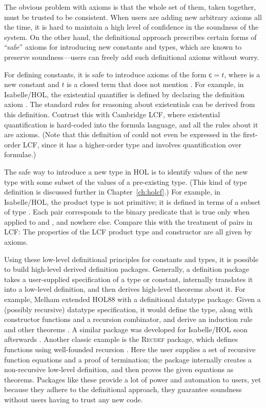 The obvious problem with axioms is that the whole set of them, taken together, must be trusted to be consistent. When users are adding new arbitrary axioms all the time, it is hard to maintain a high level of confidence in the soundness of the system. On the other hand, the definitional approach prescribes certain forms of ``safe'' axioms for introducing new constants and types, which are known to preserve soundness---users can freely add such definitional axioms without worry.

For defining constants, it is safe to introduce axioms of the form $\mathsf{c} = t$, where  is a new constant and $t$ is a closed term that does not mention . For example, in Isabelle/HOL, the existential quantifier  is defined by declaring the definition axiom . The standard rules for reasoning about existentials can be derived from this definition. Contrast this with Cambridge LCF, where existential quantification is hard-coded into the formula language, and all the rules about it are axioms. (Note that this definition of  could not even be expressed in the first-order LCF, since it has a higher-order type and involves quantification over formulae.)

The safe way to introduce a new type in HOL is to identify values of the new type with some subset of the values of a pre-existing type. (This kind of type definition is discussed further in Chapter~\ref{ch:holcf}.) For example, in Isabelle/HOL, the product type  is not primitive; it is defined in terms of a subset of type . Each pair  corresponds to the binary predicate that is true only when applied to  and , and nowhere else. Compare this with the treatment of pairs in LCF: The properties of the LCF product type and  constructor are all given by axioms.

Using these low-level definitional principles for constants and types, it is possible to build high-level derived definition packages. Generally, a definition package takes a user-supplied specification of a type or constant, internally translates it into a low-level definition, and then derives high-level theorems about it. For example, Melham extended HOL88 with a definitional datatype package: Given a (possibly recursive) datatype specification, it would define the type, along with constructor functions and a recursion combinator, and derive an induction rule and other theorems \cite{melham89automating}. A similar package was developed for Isabelle/HOL soon afterwards \cite{bw99inductivedatatypes}. Another classic example is the \textsc{Recdef} package, which defines functions using well-founded recursion \cite{Slind96recdef}. Here the user supplies a set of recursive function equations and a proof of termination; the package internally creates a non-recursive low-level definition, and then proves the given equations as theorems. Packages like these provide a lot of power and automation to users, yet because they adhere to the definitional approach, they guarantee soundness without users having to trust any new code.

